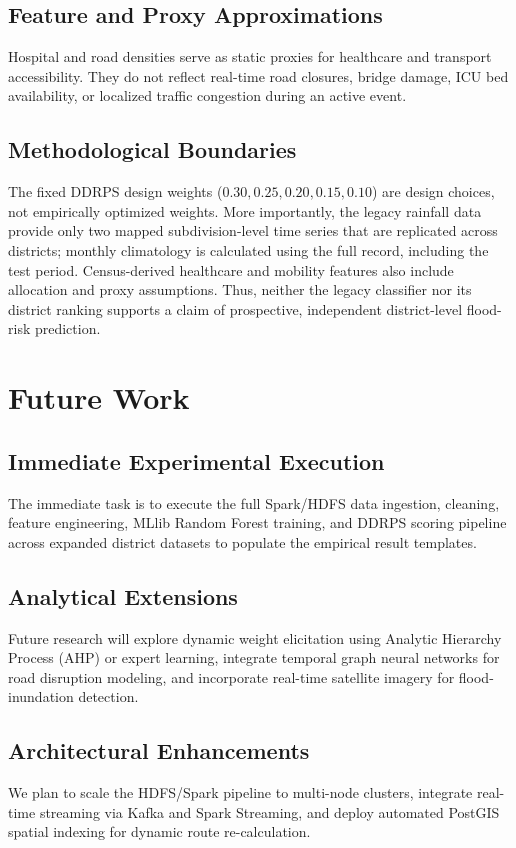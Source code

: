 \documentclass[conference]{IEEEtran}
\begin{document}
\subsection{Feature and Proxy Approximations}
Hospital and road densities serve as static proxies for healthcare and transport
accessibility. They do not reflect real-time road closures, bridge damage, ICU
bed availability, or localized traffic congestion during an active event.

\subsection{Methodological Boundaries}
The fixed DDRPS design weights ($0.30, 0.25, 0.20, 0.15, 0.10$) are design
choices, not empirically optimized weights. More importantly, the legacy
rainfall data provide only two mapped subdivision-level time series that are
replicated across districts; monthly climatology is calculated using the full
record, including the test period. Census-derived healthcare and mobility
features also include allocation and proxy assumptions. Thus, neither the
legacy classifier nor its district ranking supports a claim of prospective,
independent district-level flood-risk prediction.

\section{Future Work}

\subsection{Immediate Experimental Execution}
The immediate task is to execute the full Spark/HDFS data ingestion, cleaning,
feature engineering, MLlib Random Forest training, and DDRPS scoring pipeline across
expanded district datasets to populate the empirical result templates.

\subsection{Analytical Extensions}
Future research will explore dynamic weight elicitation using Analytic Hierarchy
Process (AHP) or expert learning, integrate temporal graph neural networks for
road disruption modeling, and incorporate real-time satellite imagery for
flood-inundation detection.

\subsection{Architectural Enhancements}
We plan to scale the HDFS/Spark pipeline to multi-node clusters, integrate
real-time streaming via Kafka and Spark Streaming, and deploy automated PostGIS
spatial indexing for dynamic route re-calculation.
\end{document}
